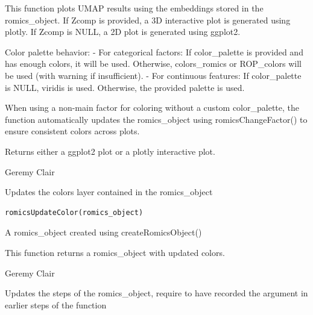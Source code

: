 \documentclass[a4paper]{book}
\begin{document}
%
\begin{Details}
This function plots UMAP results using the embeddings stored in the romics\_object.
If Zcomp is provided, a 3D interactive plot is generated using plotly.
If Zcomp is NULL, a 2D plot is generated using ggplot2.

Color palette behavior:
- For categorical factors: If color\_palette is provided and has enough colors, it will be used.
Otherwise, colors\_romics or ROP\_colors will be used (with warning if insufficient).
- For continuous features: If color\_palette is NULL, viridis is used. Otherwise, the provided palette is used.

When using a non-main factor for coloring without a custom color\_palette, the function automatically
updates the romics\_object using romicsChangeFactor() to ensure consistent colors across plots.
\end{Details}
%
\begin{Value}
Returns either a ggplot2 plot or a plotly interactive plot.
\end{Value}
%
\begin{Author}
Geremy Clair
\end{Author}
%
\begin{Description}
Updates the colors layer contained in the romics\_object
\end{Description}
%
\begin{Usage}
\begin{verbatim}
romicsUpdateColor(romics_object)
\end{verbatim}
\end{Usage}
%
\begin{Arguments}
\begin{ldescription}
\item[\code{romics\_object}] A romics\_object created using createRomicsObject()
\end{ldescription}
\end{Arguments}
%
\begin{Value}
This function returns a romics\_object with updated colors.
\end{Value}
%
\begin{Author}
Geremy Clair
\end{Author}
%
\begin{Description}
Updates the steps of the romics\_object, require to have recorded the argument in earlier steps of the function
\end{Description}
\end{document}
